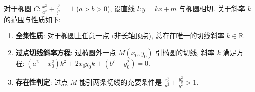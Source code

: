 \begin{statementbox}
对于椭圆 $C: \frac{x^2}{a^2} + \frac{y^2}{b^2} = 1$ ($a>b>0$), 设直线 $l: y = kx + m$ 与椭圆相切. 关于斜率 $k$ 的范围与性质如下:
\begin{enumerate}
    \item \textbf{全集性质}: 对于椭圆上任意一点 (非长轴顶点), 总存在唯一的切线斜率 $k \in \mathbb{R}$.
    \item \textbf{过点切线斜率方程}: 过椭圆外一点 $M(x_0, y_0)$ 引椭圆的切线, 斜率 $k$ 满足方程: $(a^2 - x_0^2)k^2 + 2x_0y_0k + (b^2 - y_0^2) = 0$.
    \item \textbf{存在性判定}: 过点 $M$ 能引两条切线的充要条件是 $\frac{x_0^2}{a^2} + \frac{y_0^2}{b^2} > 1$.
\end{enumerate}
\end{statementbox}